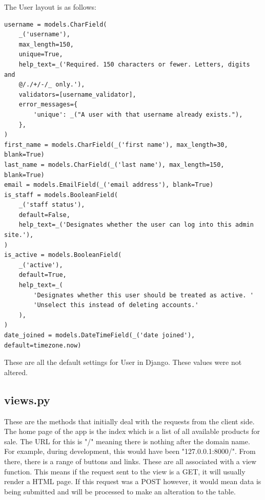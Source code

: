 The User layout is as follows:
\begin{verbatim}
username = models.CharField(
    _('username'),
    max_length=150,
    unique=True,
    help_text=_('Required. 150 characters or fewer. Letters, digits and 
    @/./+/-/_ only.'),
    validators=[username_validator],
    error_messages={
        'unique': _("A user with that username already exists."),
    },
)
first_name = models.CharField(_('first name'), max_length=30, blank=True)
last_name = models.CharField(_('last name'), max_length=150, blank=True)
email = models.EmailField(_('email address'), blank=True)
is_staff = models.BooleanField(
    _('staff status'),
    default=False,
    help_text=_('Designates whether the user can log into this admin site.'),
)
is_active = models.BooleanField(
    _('active'),
    default=True,
    help_text=_(
        'Designates whether this user should be treated as active. '
        'Unselect this instead of deleting accounts.'
    ),
)
date_joined = models.DateTimeField(_('date joined'), default=timezone.now)
\end{verbatim}
These are all the default settings for User in Django. These values were not altered.

\subsection{views.py}
These are the methods that initially deal with the requests from the client side. The home page of the app is the index which is a list of all available products for sale. The URL for this is "/" meaning there is nothing after the domain name. For example, during development, this would have been "127.0.0.1:8000/". From there, there is a range of buttons and links. These are all associated with a view function. This means if the request sent to the view is a GET, it will usually render a HTML page. If this request was a POST however, it would mean data is being submitted and will be processed to make an alteration to the table.
